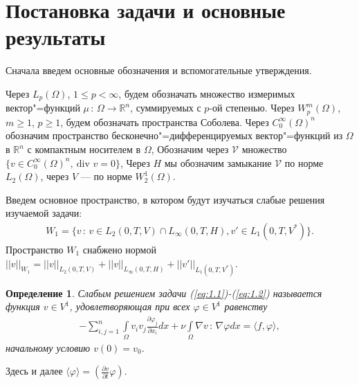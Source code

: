 \documentclass[14pt, a4paper]{extarticle}
\newtheorem{definition}{Определение}[section]
\numberwithin{equation}{section}
\begin{document}
    \section{Постановка задачи и основные результаты}

    Сначала введем основные обозначения и вспомогательные утверждения.

    Через $L_p(\Omega)$, $1 \leqslant p < \infty$, будем обозначать множество измеримых вектор"=функций 
    $\mu\, : \,\Omega \rightarrow \mathbb{R}^n$, суммируемых с $p$-ой степенью. Через $W_p^m(\Omega)$, $m \geqslant 1$, $p \geqslant 1$,
    будем обозначать пространства Соболева. Через $C_0^{\infty}(\Omega)^n$ обозначим пространство бесконечно"=дифференцируемых
    вектор"=функций из $\Omega$ в $\mathbb{R}^n$ с компактным носителем в $\Omega$, Обозначим 
    через $\mathcal{V}$ множество $\{v \in C_0^\infty(\Omega)^n, \ \textrm{div } v = 0\}$, Через $H$ мы обозначим замыкание $\mathcal{V}$ по норме 
    $L_2(\Omega)$, через $V$ --- по норме $W_2^1(\Omega)$.

    Введем основное пространство, в котором будут изучаться слабые решения изучаемой задачи:
    \begin{equation*}
        \begin{gathered}
            W_1 = \{v\, : \,v \in L_2(0,T,V) \cap L_\infty(0,T,H), v' \in L_1(0,T,V^*)\}.
        \end{gathered}
    \end{equation*}
    Пространство $W_1$ снабжено нормой $||v||_{W_1} = ||v||_{L_2(0,T,V)} + ||v||_{L_\infty(0,T,H)} + ||v'||_{L_1(0,T,V^*)}$.
    \begin{definition}
        Слабым решением задачи (\ref{eq:1.1})-(\ref{eq:1.2}) называется функция $v \in V^1$,
        удовлетворяющая при всех $\varphi \in V^1$ равенству
        \begin{equation}\label{eq:2.1}
            \begin{gathered}
                - \sum\limits_{i,j=1}^n \int\limits_\Omega v_i v_j
                \frac{\partial\varphi_j}{\partial x_i}dx + \nu\int\limits_\Omega
                \nabla v\, : \, \nabla\varphi dx = \langle f, \varphi \rangle,
            \end{gathered}
        \end{equation}
        \noindent начальному условию $v(0) = v_0$.
    \end{definition}

    Здесь и далее $\langle \varphi \rangle = (\frac{\partial v}{\partial t} \varphi)$.
\end{document}
